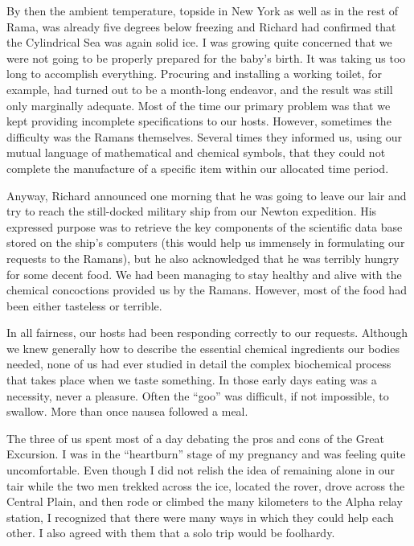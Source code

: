 \documentclass[]{article}
\begin{document}
By then the ambient temperature, topside in New York as well as in the rest of Rama, was already five degrees below freezing and Richard had confirmed that the Cylindrical Sea was again solid ice.  I was growing quite concerned that we were not going to be properly prepared for the baby’s birth.  It was taking us too long to accomplish everything.  Procuring and installing a working toilet, for example, had turned out to be a month-long endeavor, and the result was still only marginally adequate.  Most of the time our primary problem was that we kept providing incomplete specifications to our hosts.  However, sometimes the difficulty was the Ramans themselves.  Several times they informed us, using our mutual language of mathematical and chemical symbols, that they could not complete the manufacture of a specific item within our allocated time period.

Anyway, Richard announced one morning that he was going to leave our lair and try to reach the still-docked military ship from our Newton expedition.  His expressed purpose was to retrieve the key components of the scientific data base stored on the ship’s computers (this would help us immensely in formulating our requests to the Ramans), but he also acknowledged that he was terribly hungry for some decent food.  We had been managing to stay healthy and alive with the chemical concoctions provided us by the Ramans.  However, most of the food had been either tasteless or terrible.

In all fairness, our hosts had been responding correctly to our requests.  Although we knew generally how to describe the essential chemical ingredients our bodies needed, none of us had ever studied in detail the complex biochemical process that takes place when we taste something.  In those early days eating was a necessity, never a pleasure.  Often the “goo” was difficult, if not impossible, to swallow.  More than once nausea followed a meal.

The three of us spent most of a day debating the pros and cons of the Great Excursion.  I was in the “heartburn” stage of my pregnancy and was feeling quite uncomfortable.  Even though I did not relish the idea of remaining alone in our tair while the two men trekked across the ice, located the rover, drove across the Central Plain, and then rode or climbed the many kilometers to the Alpha relay station, I recognized that there were many ways in which they could help each other.  I also agreed with them that a solo trip would be foolhardy.
\end{document}
